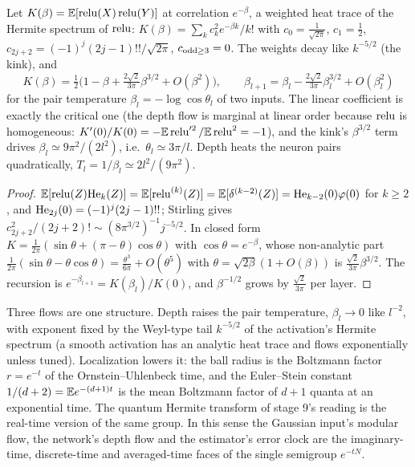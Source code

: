 \begin{proposition}\label{prop:heattrace}
Let $K(\beta)=\mathbb E[\operatorname{relu}(X)\operatorname{relu}(Y)]$ at correlation $e^{-\beta}$, a weighted heat trace of the Hermite spectrum of
$\operatorname{relu}$: $K(\beta)=\sum_kc_k^2e^{-\beta k}/k!$ with $c_0=\tfrac1{\sqrt{2\pi}}$, $c_1=\tfrac12$, $c_{2j+2}=(-1)^j(2j-1)!!/\sqrt{2\pi}$,
$c_{\rm odd\ge3}=0$. The weights decay like $k^{-5/2}$ (the kink), and
\[
K(\beta)=\tfrac12\Big(1-\beta+\tfrac{2\sqrt2}{3\pi}\beta^{3/2}+O(\beta^2)\Big),\qquad
\beta_{l+1}=\beta_l-\tfrac{2\sqrt2}{3\pi}\beta_l^{3/2}+O(\beta_l^2)
\]
for the pair temperature $\beta_l=-\log\cos\theta_l$ of two inputs. The linear coefficient is exactly the critical one
(the depth flow is marginal at linear order because $\operatorname{relu}$ is homogeneous: $K'(0)/K(0)=-\mathbb E\operatorname{relu}'^2/\mathbb E\operatorname{relu}^2=-1$), and the
kink's $\beta^{3/2}$ term drives $\beta_l\simeq9\pi^2/(2l^2)$, i.e.\ $\theta_l\simeq3\pi/l$. Depth heats the neuron pairs
quadratically, $T_l=1/\beta_l\simeq2l^2/(9\pi^2)$.
\end{proposition}
\begin{proof}
$\mathbb E[\operatorname{relu}(Z)\mathrm{He}_k(Z)]=\mathbb E[\operatorname{relu}^{(k)}(Z)]=\mathbb E[\delta^{(k-2)}(Z)]=\mathrm{He}_{k-2}(0)\varphi(0)$ for $k\ge2$, and
$\mathrm{He}_{2j}(0)=(-1)^j(2j-1)!!$; Stirling gives $c_{2j+2}^2/(2j+2)!\sim(8\pi^{3/2})^{-1}j^{-5/2}$. In closed form
$K=\tfrac1{2\pi}(\sin\theta+(\pi-\theta)\cos\theta)$ with $\cos\theta=e^{-\beta}$, whose non-analytic part
$\tfrac1{2\pi}(\sin\theta-\theta\cos\theta)=\tfrac{\theta^3}{6\pi}+O(\theta^5)$ with $\theta=\sqrt{2\beta}(1+O(\beta))$ is
$\tfrac{\sqrt2}{3\pi}\beta^{3/2}$. The recursion is $e^{-\beta_{l+1}}=K(\beta_l)/K(0)$, and $\beta^{-1/2}$ grows by
$\tfrac{\sqrt2}{3\pi}$ per layer.
\end{proof}

\begin{remark}
Three flows are one structure. Depth raises the pair temperature, $\beta_l\to0$ like $l^{-2}$, with exponent fixed by the
Weyl-type tail $k^{-5/2}$ of the activation's Hermite spectrum (a smooth activation has an analytic heat trace and flows
exponentially unless tuned). Localization lowers it: the ball radius is the Boltzmann factor $r=e^{-t}$ of the
Ornstein--Uhlenbeck time, and the Euler--Stein constant $1/(d+2)=\mathbb E e^{-(d+1)t}$ is the mean Boltzmann factor of $d+1$
quanta at an exponential time. The quantum Hermite transform of stage 9's reading is the real-time version of the same
group. In this sense the Gaussian input's modular flow, the network's depth flow and the estimator's error clock are
the imaginary-time, discrete-time and averaged-time faces of the single semigroup $e^{-tN}$.
\end{remark}
